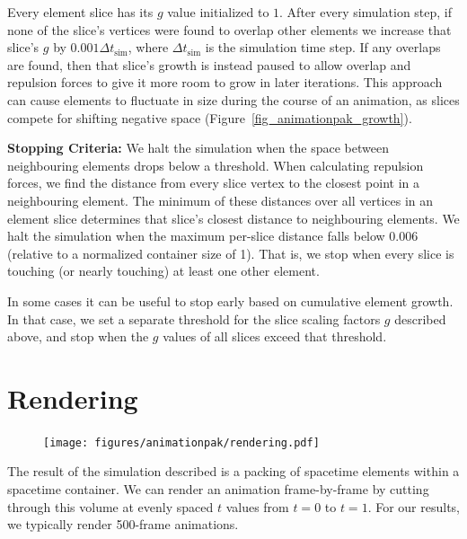 Every element slice has its $g$ value initialized to $1$.  After every
simulation step, if none of the slice's vertices were found to 
overlap other elements we increase that slice's $g$ by 
$0.001 \Delta t_\mathrm{sim}$, where $\Delta t_\mathrm{sim}$ is the 
simulation time step.  If any overlaps are found, then that slice's
growth is instead paused to allow overlap and repulsion forces to give it more
room to grow in later iterations.  
This approach can cause elements to fluctuate in size during the course
of an animation, as slices compete for shifting negative space 
(Figure~\ref{fig_animationpak_growth}).

\textbf{Stopping Criteria:} We halt the simulation when the space between
neighbouring elements drops below a threshold.  When calculating 
repulsion forces, we find the distance from every slice vertex
to the closest point in a neighbouring element.  The minimum of these
distances over all vertices in an element slice determines that slice's
closest distance to neighbouring elements.  We halt the simulation
when the maximum per-slice distance falls below 0.006 (relative to a normalized
container size of 1).  That is, we stop when every slice is touching
(or nearly touching) at least one other element.

In some cases it can be useful to stop early based on cumulative element
growth.  In that case, we set a separate threshold for the slice scaling
factors $g$ described above, and stop when the $g$ values of all
slices exceed that threshold.


\section{Rendering}
\label{animationpak_rendering}

\begin{figure}
\centering
\texttt{[image: figures/animationpak/rendering.pdf]} 
\caption[An illustration of rendering spacetime elements to generate 2D frames]
{\label{fig_animationpak_render} 
}
\end{figure}

The result of the simulation described  is a packing of spacetime 
elements within a spacetime container.  We can render an
animation frame-by-frame by cutting through this volume at 
evenly spaced $t$ values from $t=0$ to $t=1$.  For our results, we
typically render 500-frame animations.

